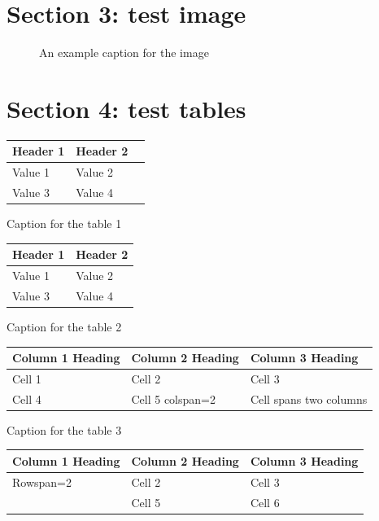 \documentclass[11pt,a4paper]{article}
\begin{document}
\section{Section 3: test image}

\begin{figure}[h]
\end{figure}

\begin{figure}[h]
\caption{An example caption for the image}
\end{figure}

\section{Section 4: test tables}

\begin{table}[h]
\begin{tabular}{|l|l|l|}
\hline
Header 1 & Header 2 &  \\ \hline
Value 1 & Value 2 &  \\ \hline
Value 3 & Value 4 &  \\ \hline
\end{tabular}
\end{table}

Caption for the table 1

\begin{table}[h]
\begin{tabular}{|l|l|}
\hline
Header 1 & Header 2 \\ \hline
Value 1 & Value 2 \\ \hline
Value 3 & Value 4 \\ \hline
\end{tabular}
\end{table}

Caption for the table 2

\begin{table}[h]
\begin{tabular}{|l|l|l|}
\hline
Column 1 Heading & Column 2 Heading & Column 3 Heading \\ \hline
Cell 1 & Cell 2 & Cell 3 \\ \hline
Cell 4 & Cell 5 colspan=2 & Cell spans two columns \\ \hline
\end{tabular}
\end{table}

Caption for the table 3

\begin{table}[h]
\begin{tabular}{|l|l|l|}
\hline
Column 1 Heading & Column 2 Heading & Column 3 Heading \\ \hline
Rowspan=2 & Cell 2 & Cell 3 \\ \hline
 & Cell 5 & Cell 6 \\ \hline
\end{tabular}
\end{table}
\end{document}

